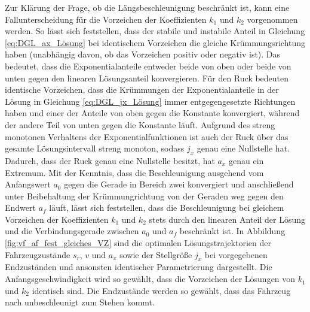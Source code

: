 Zur Klärung der Frage, ob die Längsbeschleunigung beschränkt ist, kann eine Fallunterscheidung für die Vorzeichen der Koeffizienten $k_1$ und $k_2$ vorgenommen werden. So lässt sich feststellen, dass der stabile und instabile Anteil in Gleichung \eqref{eq:DGL_ax_Lösung} bei identischem Vorzeichen die gleiche Krümmungsrichtung haben (unabhängig davon, ob das Vorzeichen positiv oder negativ ist). Das bedeutet, dass die Exponentialanteile entweder beide von oben oder beide von unten gegen den linearen Lösungsanteil konvergieren. Für den Ruck bedeuten identische Vorzeichen, dass die Krümmungen der Exponentialanteile in der Lösung in Gleichung \eqref{eq:DGL_jx_Lösung} immer entgegengesetzte Richtungen haben und einer der Anteile von oben gegen die Konstante konvergiert, während der andere Teil von unten gegen die Konstante läuft. Aufgrund des streng monotonen Verhaltens der Exponentialfunktionen ist auch der Ruck über das gesamte Lösungsintervall streng monoton, sodass $j_x$ genau eine Nullstelle hat. Dadurch, dass der Ruck genau eine Nullstelle besitzt, hat $a_x$ genau ein Extremum. Mit der Kenntnis, dass die Beschleunigung ausgehend vom Anfangswert $a_0$ gegen die Gerade in Bereich zwei konvergiert und anschließend unter Beibehaltung der Krümmungrichtung von der Geraden weg gegen den Endwert $a_f$ läuft, lässt sich feststellen, dass die Beschleunigung bei gleichem Vorzeichen der Koeffizienten $k_1$ und $k_2$ stets durch den linearen Anteil der Lösung und die Verbindungsgerade zwischen $a_0$ und $a_f$ beschränkt ist. In Abbildung \ref{fig:vf_af_fest_gleiches_VZ} sind die optimalen Lösungstrajektorien der Fahrzeugzustände $s_r$, $v$ und $a_x$ sowie der Stellgröße $j_x$ bei vorgegebenen Endzuständen und ansonsten identischer Parametrierung dargestellt. Die Anfangsgeschwindigkeit wird so gewählt, dass die Vorzeichen der Lösungen von $k_1$ und $k_2$ identisch sind. Die Endzustände werden so gewählt, dass das Fahrzeug nach  unbeschleunigt zum Stehen kommt.
